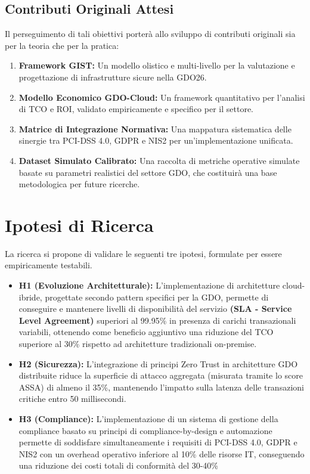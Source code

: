 \subsection{Contributi Originali Attesi}
Il perseguimento di tali obiettivi porterà allo sviluppo di contributi originali sia per la teoria che per la pratica:
\begin{enumerate}
    \item \textbf{Framework GIST:} Un modello olistico e multi-livello per la valutazione e progettazione di infrastrutture sicure nella GDO26.
    \item \textbf{Modello Economico GDO-Cloud:} Un framework quantitativo per l'analisi di TCO e ROI, validato empiricamente e specifico per il settore.
    \item \textbf{Matrice di Integrazione Normativa:} Una mappatura sistematica delle sinergie tra PCI-DSS 4.0, GDPR e NIS2 per un'implementazione unificata.
    \item \textbf{Dataset Simulato Calibrato:} Una raccolta di metriche operative simulate basate su parametri realistici del settore GDO, che costituirà una base metodologica per future ricerche.
\end{enumerate}



\section{Ipotesi di Ricerca}
La ricerca si propone di validare le seguenti tre ipotesi, formulate per essere empiricamente testabili.
\begin{itemize}
    \item \textbf{H1 (Evoluzione Architetturale):} L'implementazione di architetture cloud-ibride, progettate secondo pattern specifici per la GDO, permette di conseguire e mantenere livelli di disponibilità del servizio \textbf{(SLA - Service Level Agreement)} superiori al 99.95\% in presenza di carichi transazionali variabili, ottenendo come beneficio aggiuntivo una riduzione del TCO superiore al 30\% rispetto ad architetture tradizionali on-premise.
    \item \textbf{H2 (Sicurezza):} L'integrazione di principi Zero Trust in architetture GDO distribuite riduce la superficie di attacco aggregata (misurata tramite lo score ASSA) di almeno il 35\%, mantenendo l'impatto sulla latenza delle transazioni critiche entro 50 millisecondi.
    \item \textbf{H3 (Compliance):} L'implementazione di un sistema di gestione della compliance basato su principi di compliance-by-design e automazione permette di soddisfare simultaneamente i requisiti di PCI-DSS 4.0, GDPR e NIS2 con un overhead operativo inferiore al 10\% delle risorse IT, conseguendo una riduzione dei costi totali di conformità del 30-40\%
\end{itemize}
